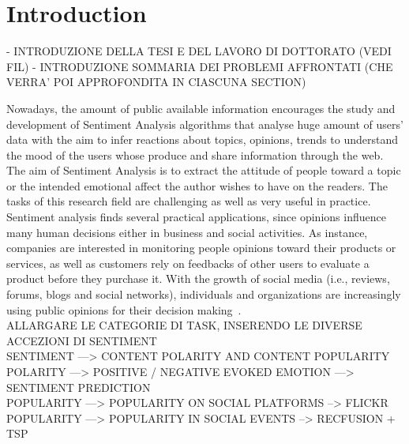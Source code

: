 \chapter{Introduction}
- INTRODUZIONE DELLA TESI E DEL LAVORO DI DOTTORATO (VEDI FIL)
- INTRODUZIONE SOMMARIA DEI PROBLEMI AFFRONTATI (CHE VERRA' POI APPROFONDITA IN CIASCUNA SECTION)

Nowadays, the amount of public available information encourages the study and development of Sentiment Analysis algorithms that analyse huge amount of users' data with the aim to infer reactions about topics, opinions, trends to understand the mood of the users whose produce and share information through the web. The aim of Sentiment Analysis is to extract the attitude of people toward a topic or the intended emotional affect the author wishes to have on the readers. The tasks of this research field are challenging as well as very useful in practice. Sentiment analysis finds several practical applications, since opinions influence many human decisions either in business and social activities.  
As instance, companies are interested in monitoring people opinions toward their products or services, as well as customers rely on feedbacks of other users to evaluate a product before they purchase it.
With the growth of social media (i.e., reviews, forums, blogs and social networks), individuals and organizations are increasingly using public opinions  for their decision making~\cite{liu2012survey}.
\\
ALLARGARE LE CATEGORIE DI TASK, INSERENDO LE DIVERSE ACCEZIONI DI SENTIMENT 
\\
SENTIMENT  ---> CONTENT POLARITY AND CONTENT POPULARITY
\\POLARITY   ---> POSITIVE / NEGATIVE EVOKED EMOTION ---> SENTIMENT PREDICTION
\\POPULARITY ---> POPULARITY ON SOCIAL PLATFORMS --> FLICKR
\\POPULARITY ---> POPULARITY IN SOCIAL EVENTS --> RECFUSION + TSP


